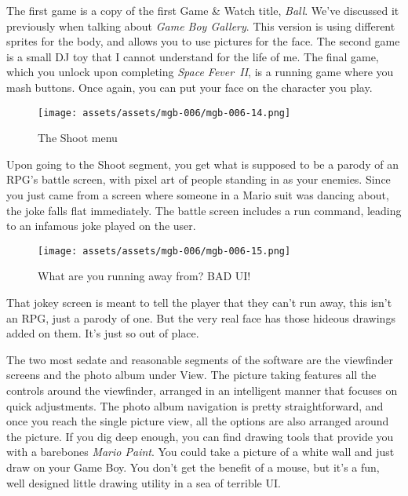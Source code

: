 \documentclass{book}
\let\oldcenter\center
\let\oldendcenter\endcenter
\renewenvironment{center}{\setlength\topsep{0pt}\oldcenter}{\oldendcenter}
\begin{document}
\begin{center}
\quad\vspace{4pt}
\quad\vspace{4pt}
\quad\vspace{4pt}
\end{center}

The first game is a copy of the first Game \& Watch title, \emph{Ball}. We’ve discussed it previously when talking about \emph{Game Boy Gallery}. This version is using different sprites for the body, and allows you to use pictures for the face. The second game is a small DJ toy that I cannot understand for the life of me. The final game, which you unlock upon completing \emph{Space Fever~II}, is a running game where you mash buttons. Once again, you can put your face on the character you play.

\begin{figure}[hbt]
\vskip 10pt
\centering \texttt{[image: assets/assets/mgb-006/mgb-006-14.png]}\par\pagetwodescription The Shoot menu
\vskip 6pt
\end{figure}

Upon going to the Shoot segment, you get what is supposed to be a parody of an RPG’s battle screen, with pixel art of people standing in as your enemies. Since you just came from a screen where someone in a Mario suit was dancing about, the joke falls flat immediately. The battle screen includes a run command, leading to an infamous joke played on the user.

\begin{figure}[hbt]
\vskip 10pt
\centering \texttt{[image: assets/assets/mgb-006/mgb-006-15.png]}\par\pagetwodescription What are you running away from? BAD UI!
\vskip 6pt
\end{figure}

That jokey screen is meant to tell the player that they can’t run away, this isn’t an RPG, just a parody of one. But the very real face has those hideous drawings added on them. It’s just so out of place.

The two most sedate and reasonable segments of the software are the viewfinder screens and the photo album under View. The picture taking features all the controls around the viewfinder, arranged in an intelligent manner that focuses on quick adjustments. The photo album navigation is pretty straightforward, and once you reach the single picture view, all the options are also arranged around the picture. If you dig deep enough, you can find drawing tools that provide you with a barebones \emph{Mario Paint}. You could take a picture of a white wall and just draw on your Game Boy. You don’t get the benefit of a mouse, but it’s a fun, well designed little drawing utility in a sea of terrible UI.
\end{document}
